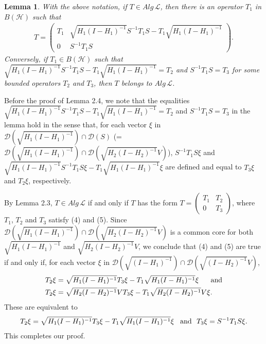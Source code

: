 \documentclass[12pt]{article}
\newtheorem{lemma}{Lemma}[section]
\newcommand{\DDD}{\mathcal D}
\newcommand{\HHH}{\mathcal H} %
\newcommand{\LLL}{\mathcal L} %
\begin{document}
{\begin{lemma} With the above notation, if $
T\in Alg\,\LLL$, then there is  an operator $T_1$ in $B(\HHH)$ such
that
\begin{align*}
T = \left(\begin{array}{cc}T_1 & \sqrt{H_{1}(I-H_{1})^{-1}}S^{-1}T_1 S -T_1 \sqrt{H_{1}(I-H_{1})^{-1}}  \\0 & S^{-1}T_1S \end{array}\right).
\end{align*}
Conversely, if $T_1 \in B(\HHH)$ such that
$\sqrt{H_{1}(I-H_{1})^{-1}}S^{-1}T_1S - T_1
\sqrt{H_{1}(I-H_{1})^{-1}} =T_2$ and $ S^{-1}T_1 S = T_3$ for some
bounded operators $T_2$ and $T_3$, then $T$ belongs to $ Alg\,\LLL$.
\end{lemma}

Before the proof of Lemma 2.4, we note that the equalities
$\sqrt{H_{1}(I-H_{1})^{-1}}S^{-1}T_1 S - T_1
\sqrt{H_{1}(I-H_{1})^{-1}} = T_2$ and $S^{-1}T_1 S= T_3$ in the
lemma hold in the sense that, for each vector $\xi$ in
$\DDD(\sqrt{H_1(I-H_1)^{-1}}) \cap \DDD(S)$ (=
$\DDD(\sqrt{H_1(I-H_1)^{-1}}) \cap \DDD(\sqrt{H_2(I-H_2)^{-1}}V) $),
$S^{-1}T_1 S\xi$ and $\sqrt{H_{1}(I-H_{1})^{-1}}S^{-1}T_1 S\xi - T_1
\sqrt{H_{1}(I-H_{1})^{-1}}\xi$ are defined and equal to $T_3\xi$ and
$T_2 \xi$, respectively. \vspace{2mm}


\quad By Lemma 2.3, $T \in  Alg\,\LLL$ if and
only if $T$ has the
 form $T = \left(\begin{array}{cc}T_1 & T_2 \\0 &
T_3\end{array}\right)$, where $T_1$, $T_2$ and $T_3$ satisfy (4) and
(5). Since $\DDD(\sqrt{H_1(I-H_1)^{-1}}) \cap
\DDD(\sqrt{H_2(I-H_2)^{-1}}V)$ is a common core for both
$\sqrt{H_1(I-H_1)^{-1}}$ and $\sqrt{H_2(I-H_2)^{-1}}V$, we conclude
that (4) and (5) are true if and only if, for each vector $\xi$ in
$\DDD(\sqrt{(I-H_1)^{-1}}) \cap \DDD(\sqrt{(I-H_2)^{-1}}V)$,
\begin{align*}
T_2 \xi &= \sqrt{H_1(I - H_1)^{-1}} T_3 \xi - T_1 \sqrt{H_1(I-H_1)^{-1}} \xi \,\,\,\,\,\,\,\,\,\,\hbox{and} \\
T_2 \xi &= \sqrt{H_2(I - H_2)^{-1}}V T_3 \xi - T_1
\sqrt{H_2(I-H_2)^{-1}}V \xi .
\end{align*}
These are equivalent to
\begin{align*}
T_2 \xi = \sqrt{H_1(I - H_1)^{-1}} T_3 \xi - T_1
\sqrt{H_1(I-H_1)^{-1}} \xi \,\,\,\,\, \hbox{and}\,\,\,\, T_3 \xi =
S^{-1}T_1S\xi.
\end{align*}
This completes our proof.



}
\end{document}
